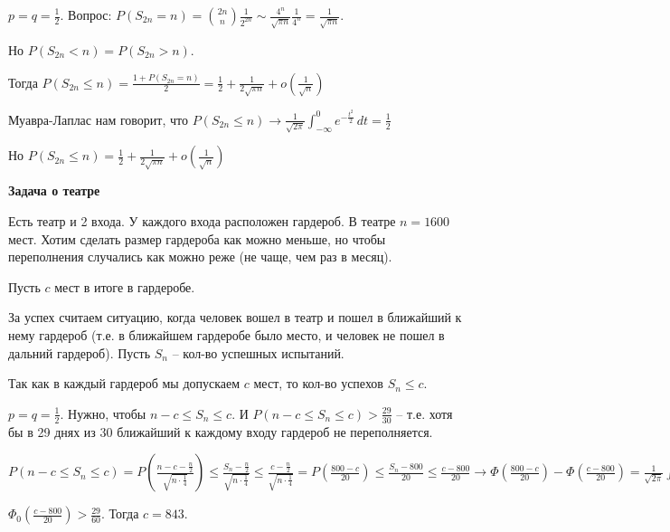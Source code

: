 \begin{example}
    $p = q = \frac{1}{2}$. Вопрос: $P(S_{2n} = n) = \binom{2n}{n} \frac{1}{2^{2n}} \sim
    \frac{4^n}{\sqrt{\pi n}} \frac{1}{4^n} = \frac{1}{\sqrt{\pi n}}$.

    Но $P(S_{2n} < n) = P(S_{2n} > n)$.

    Тогда $P(S_{2n} \leqslant n) = \frac{1 + P(S_{2n} = n)}{2} = \frac{1}{2} + \frac{1}{2\sqrt{\pi n}} + o(\frac{1}{\sqrt{n}})$

    Муавра-Лаплас нам говорит, что $P(S_{2n} \leqslant n) \to \frac{1}{\sqrt{2\pi}} \int_{-\infty}^0 e^{-\frac{t^2}{2}} \, dt = \frac{1}{2}$

    Но $P(S_{2n} \leqslant n) = \frac{1}{2} + \frac{1}{2\sqrt{\pi n}} + o(\frac{1}{\sqrt{n}})$
\end{example}

\begin{example}
    \textbf{Задача о театре}

    Есть театр и 2 входа. У каждого входа расположен гардероб.
    В театре $n = 1600$ мест. Хотим сделать размер гардероба как можно меньше, но чтобы
    переполнения случались как можно реже (не чаще, чем раз в месяц).

    Пусть $c$ мест в итоге в гардеробе.

    За успех считаем ситуацию, когда человек вошел в театр и пошел в ближайший к нему гардероб (т.е. в ближайшем гардеробе было место, и человек не пошел в дальний гардероб). Пусть $S_n$ -- кол-во успешных испытаний.

    Так как в каждый гардероб мы допускаем $c$ мест, то кол-во успехов $S_n \leq c$.

    $p = q = \frac{1}{2}$. Нужно, чтобы $n - c \leqslant S_n \leqslant c$. И $P(n - c \leqslant S_n \leqslant c) > \frac{29}{30}$ -- т.е. хотя бы в 29 днях из 30 ближайший к каждому входу гардероб не переполняется.

    $P(n - c \leqslant S_n \leqslant c) = P(\frac{n - c - \frac{n}{2}}{\sqrt{n \cdot \frac{1}{4}}})
    \leqslant \frac{S_n - \frac{n}{2}}{\sqrt{n \cdot \frac{1}{4}}} \leqslant \frac{c - \frac{n}{2}}{\sqrt{n \cdot \frac{1}{4}}} =
    P(\frac{800 - c}{20}) \leqslant \frac{S_n - 800}{20} \leqslant \frac{c - 800}{20} \to \Phi (\frac{800 - c}{20}) - \Phi (\frac{c - 800}{20}) =
    \frac{1}{\sqrt{2\pi}} \int_{\frac{800 - c}{20}}^{\frac{c - 800}{20}} e^{-\frac{t^2}{2}} \, dt > \frac{29}{30}$

    $\Phi_0 (\frac{c - 800}{20}) > \frac{29}{60}$. Тогда $c = 843$.

\end{example}

